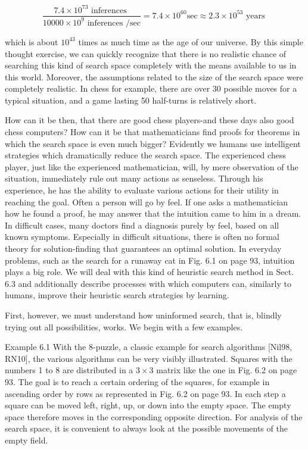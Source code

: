 \documentclass[10pt]{book}
\begin{document}
\begin{center}
$$
\frac{7.4 \times 10^{73} \text { inferences }}{10000 \times 10^{9} \text { inferences } / \mathrm{sec}}=7.4 \times 10^{60} \mathrm{sec} \approx 2.3 \times 10^{53} \text { years }
$$

which is about $10^{43}$ times as much time as the age of our universe. By this simple thought exercise, we can quickly recognize that there is no realistic chance of searching this kind of search space completely with the means available to us in this world. Moreover, the assumptions related to the size of the search space were completely realistic. In chess for example, there are over 30 possible moves for a typical situation, and a game lasting 50 half-turns is relatively short.

How can it be then, that there are good chess players-and these days also good chess computers? How can it be that mathematicians find proofs for theorems in which the search space is even much bigger? Evidently we humans use intelligent strategies which dramatically reduce the search space. The experienced chess player, just like the experienced mathematician, will, by mere observation of the situation, immediately rule out many actions as senseless. Through his experience, he has the ability to evaluate various actions for their utility in reaching the goal. Often a person will go by feel. If one asks a mathematician how he found a proof, he may answer that the intuition came to him in a dream. In difficult cases, many doctors find a diagnosis purely by feel, based on all known symptoms. Especially in difficult situations, there is often no formal theory for solution-finding that guarantees an optimal solution. In everyday problems, such as the search for a runaway cat in Fig. 6.1 on page 93, intuition plays a big role. We will deal with this kind of heuristic search method in Sect. 6.3 and additionally describe processes with which computers can, similarly to humans, improve their heuristic search strategies by learning.

First, however, we must understand how uninformed search, that is, blindly trying out all possibilities, works. We begin with a few examples.

Example 6.1 With the 8-puzzle, a classic example for search algorithms [Nil98, RN10], the various algorithms can be very visibly illustrated. Squares with the numbers 1 to 8 are distributed in a $3 \times 3$ matrix like the one in Fig. 6.2 on page 93. The goal is to reach a certain ordering of the squares, for example in ascending order by rows as represented in Fig. 6.2 on page 93. In each step a square can be moved left, right, up, or down into the empty space. The empty space therefore moves in the corresponding opposite direction. For analysis of the search space, it is convenient to always look at the possible movements of the empty field.


\end{center}
\end{document}
